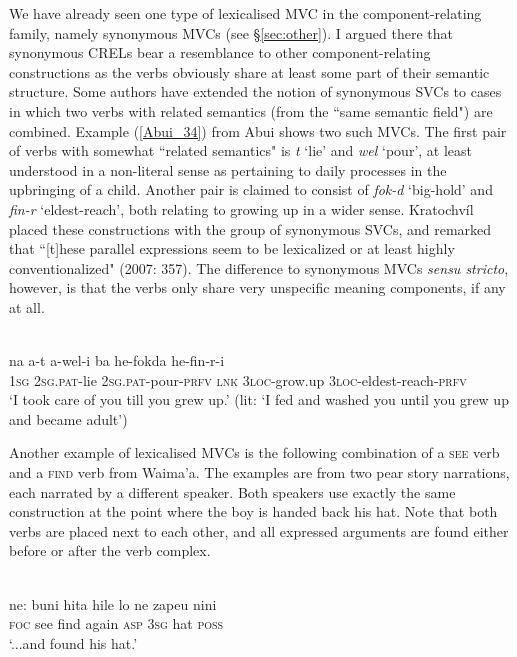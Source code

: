 We have already seen one type of lexicalised MVC in the component-relating family, namely synonymous MVCs (see §\ref{sec:other}). I argued there that synonymous CRELs bear a resemblance to other component-relating constructions as the verbs obviously share at least some part of their semantic structure. Some authors have extended the notion of synonymous SVCs to cases in which two verbs with related semantics (from the ``same semantic field") are combined. Example (\ref{Abui_34}) from Abui shows two such MVCs. The first pair of verbs with somewhat ``related semantics" is \textit{t} `lie' and \textit{wel} `pour', at least understood in a non-literal sense as pertaining to daily processes in the upbringing of a child. Another pair is claimed to consist of \textit{fok-d} `big-hold' and \textit{fin-r} `eldest-reach', both relating to growing up in a wider sense. Kratochvíl placed these constructions with the group of synonymous SVCs, and remarked that ``[t]hese parallel expressions seem to be lexicalized or at least highly conventionalized" (2007: 357). The difference to synonymous MVCs \textit{sensu stricto}, however, is that the verbs only share very unspecific meaning components, if any at all.

\ea \label{Abui_34}
\\
\gll na a-t a-wel-i ba he-fokda he-fin-r-i \\
1\textsc{sg} 2\textsc{sg}.\textsc{pat}-lie 2\textsc{sg}.\textsc{pat}-pour-\textsc{prfv} \textsc{lnk} 3\textsc{loc}-grow.up 3\textsc{loc}-eldest-reach-\textsc{prfv} \\
\glft ‘I took care of you till you grew up.’ (lit: ‘I fed and washed you until you grew up and
became adult’)\\
\z

Another example of lexicalised MVCs is the following combination of a \textsc{see} verb and a \textsc{find} verb from Waima'a. The examples are from two pear story narrations, each narrated by a different speaker. Both speakers use exactly the same construction at the point where the boy is handed back his hat. Note that both verbs are placed next to each other, and all expressed arguments are found either before or after the verb complex.

\ea 
{}\\
\gll ne: buni hita hile lo ne zapeu nini \\
\textsc{foc} see find again \textsc{asp} 3\textsc{sg} hat \textsc{poss} \\
\glft `...and found his hat.'\\ 
\z

